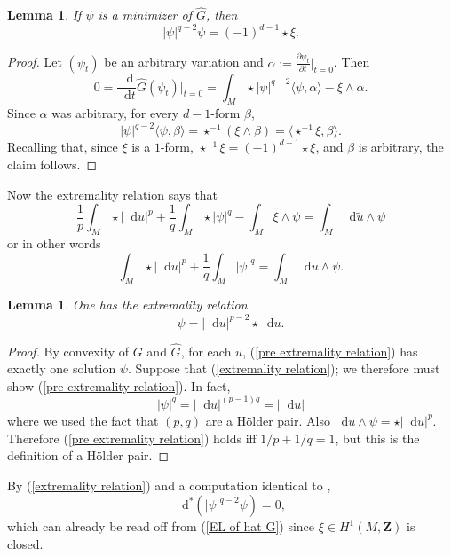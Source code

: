 \documentclass[reqno,12pt]{amsart}
\newcommand{\ZZ}{\mathbf{Z}}
\newcommand*\dif{\mathop{}\!\mathrm{d}}
\newtheorem{lemma}[theorem]{Lemma}
\theoremstyle{definition}
\numberwithin{equation}{section}
\begin{document}
\begin{lemma}
If $\psi$ is a minimizer of $\hat G$, then
\begin{equation}\label{EL of hat G}
|\psi|^{q - 2} \psi = (-1)^{d - 1} \star \xi.
\end{equation}
\end{lemma}
\begin{proof}
Let $(\psi_t)$ be an arbitrary variation and $\alpha := \frac{\partial \psi_t}{\partial t}|_{t = 0}$. Then 
$$0 = \frac{\dif}{\dif t} \hat G(\psi_t)\bigg|_{t = 0} = \int_M \star |\psi|^{q - 2} \langle \psi, \alpha \rangle - \xi \wedge \alpha.$$
Since $\alpha$ was arbitrary, for every $d-1$-form $\beta$,
$$|\psi|^{q - 2} \langle \psi, \beta\rangle = \star^{-1}(\xi \wedge \beta) = \langle \star^{-1} \xi, \beta\rangle.$$
Recalling that, since $\xi$ is a $1$-form, $\star^{-1} \xi = (-1)^{d - 1} \star \xi$, and $\beta$ is arbitrary, the claim follows.
\end{proof}

Now the extremality relation \cite[(III.4.23)]{Ekeland99} says that 
$$\frac{1}{p} \int_M \star |\dif u|^p + \frac{1}{q} \int_M \star |\psi|^q - \int_M \xi \wedge \psi = \int_M \dif \tilde u \wedge \psi$$
or in other words 
\begin{equation}\label{pre extremality relation}
\int_M \star |\dif u|^p + \frac{1}{q} \int_M |\psi|^q = \int_M \dif u \wedge \psi.
\end{equation}

\begin{lemma}
One has the extremality relation
\begin{equation}\label{extremality relation}
\psi = |\dif u|^{p - 2} \star \dif u.
\end{equation}
\end{lemma}
\begin{proof}
By convexity of $G$ and $\hat G$, for each $u$, (\ref{pre extremality relation}) has exactly one solution $\psi$.
Suppose that (\ref{extremality relation}); we therefore must show (\ref{pre extremality relation}).
In fact,
$$|\psi|^q = |\dif u|^{(p - 1)q} = |\dif u|$$
where we used the fact that $(p, q)$ are a H\"older pair. Also $\dif u \wedge \psi = \star |\dif u|^p$.
Therefore (\ref{pre extremality relation}) holds iff $1/p + 1/q = 1$, but this is the definition of a H\"older pair.
\end{proof}

By (\ref{extremality relation}) and a computation identical to \cite[Lemma 3.2]{Daskalopolous20},
\begin{equation}\label{first order qLap}
\dif^* (|\psi|^{q - 2} \psi) = 0,
\end{equation}
which can already be read off from (\ref{EL of hat G}) since $\xi \in H^1(M, \ZZ)$ is closed.
\end{document}
